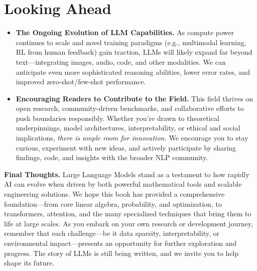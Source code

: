 \section{Looking Ahead}
\label{sec:looking_ahead}
\begin{itemize}
    \item \textbf{The Ongoing Evolution of LLM Capabilities.} 
    As compute power continues to scale and novel training paradigms (e.g., multimodal learning, RL from human feedback) gain traction, LLMs will likely expand far beyond text—integrating images, audio, code, and other modalities. We can anticipate even more sophisticated reasoning abilities, lower error rates, and improved zero-shot/few-shot performance.
    \item \textbf{Encouraging Readers to Contribute to the Field.} 
    This field thrives on open research, community-driven benchmarks, and collaborative efforts to push boundaries responsibly. Whether you’re drawn to theoretical underpinnings, model architectures, interpretability, or ethical and social implications, \emph{there is ample room for innovation.} We encourage you to stay curious, experiment with new ideas, and actively participate by sharing findings, code, and insights with the broader NLP community.
\end{itemize}
\bigskip
\noindent
\textbf{Final Thoughts.} Large Language Models stand as a testament to how rapidly AI can evolve when driven by both powerful mathematical tools and scalable engineering solutions. We hope this book has provided a comprehensive foundation—from core linear algebra, probability, and optimization, to transformers, attention, and the many specialized techniques that bring them to life at large scales. As you embark on your own research or development journey, remember that each challenge—be it data sparsity, interpretability, or environmental impact—presents an opportunity for further exploration and progress. The story of LLMs is still being written, and we invite you to help shape its future. 

